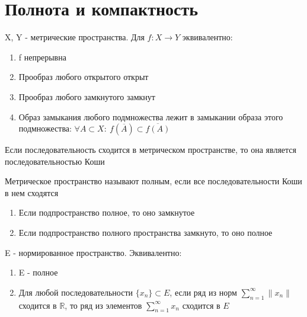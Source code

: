 \documentclass[a4paper,12pt]{article}
\begin{document}
\section{Полнота и компактность}

\begin{theorem*}
X, Y - метрические пространства. Для $f: X \to Y$ эквивалентно:
\begin{enumerate}
    \item f непрерывна
    \item Прообраз любого открытого открыт
    \item Прообраз любого замкнутого замкнут
    \item Образ замыкания любого подмножества лежит в замыкании образа этого подмножества: $\forall A \subset X : \ f(\overline{A}) \subset \overline{f(A)}$
\end{enumerate}
\end{theorem*}

\begin{claim*}
Если последовательность сходится в метрическом пространстве, то она является последовательностью Коши 
\end{claim*}

\begin{definition*}[Полнота]
Метрическое пространство называют полным, если все последовательности Коши в нем сходятся
\end{definition*}

\begin{claim*}
\begin{enumerate}
    \item Если подпространство полное, то оно замкнутое
    \item Если подпространство полного пространства замкнуто, то оно полное
\end{enumerate}
\end{claim*}

\begin{claim*}
E - нормированное пространство. Эквивалентно:
\begin{enumerate}
    \item E - полное
    \item Для любой последовательности \( \{x_n\} \subset E \), если ряд из норм \( \sum_{n=1}^\infty \|x_n\| \) сходится в $\mathbb{R}$, то ряд из элементов \( \sum_{n=1}^\infty x_n \) сходится в \( E \)
    
\end{enumerate}
\end{claim*}
\end{document}
